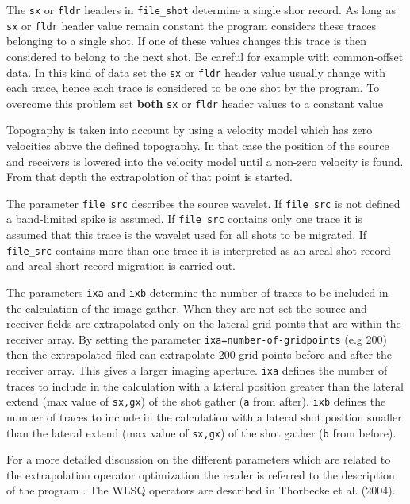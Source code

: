 The {\tt sx} or {\tt fldr} headers in {\tt file\_shot} determine a single shor record. As long as {\tt sx} or {\tt fldr} header value remain constant the program considers these traces belonging to a single shot. If one of these values changes this trace is then considered to belong to the next shot. Be careful for example with common-offset data. In this kind of data set the {\tt sx} or {\tt fldr} header value usually change with each trace, hence each trace is considered to be one shot by the program. To overcome this problem set {\bf both} {\tt sx} or {\tt fldr} header values to a constant value 
 
Topography is taken into account by using a velocity model which has zero velocities above the defined topography. In that case the position of the source and receivers is lowered into the velocity model until a non-zero velocity is found. From that depth the extrapolation of that point is started. 

The parameter {\tt file\_src} describes the source wavelet. If {\tt file\_src} is not defined a band-limited spike is assumed. If {\tt file\_src} contains only one trace it is assumed that this trace is the wavelet used for all shots to be migrated. If {\tt file\_src} contains more than one trace it is interpreted as an areal shot record and areal short-record migration is carried out. 

The parameters {\tt ixa} and {\tt ixb} determine the number of traces to be included in the calculation of the image gather. When they are not set the source and receiver fields are extrapolated only on the lateral grid-points that are within the receiver array. By setting the parameter {\tt ixa=number-of-gridpoints} (e.g 200) then the extrapolated filed can extrapolate 200 grid points before and after the receiver array. This gives a larger imaging aperture. {\tt ixa} defines the number of traces to include in the calculation with a lateral position greater than the lateral extend (max value of {\tt sx,gx}) of the shot gather ({\tt a} from after). 
{\tt ixb} defines the number of traces to include in the calculation with a lateral shot position smaller than the lateral extend (max value of {\tt sx,gx}) of the shot gather ({\tt b} from before).


For a more detailed discussion on the different parameters which are related to the extrapolation operator optimization the reader is referred to the description of the program . The WLSQ operators are described in Thorbecke et al. (2004).


